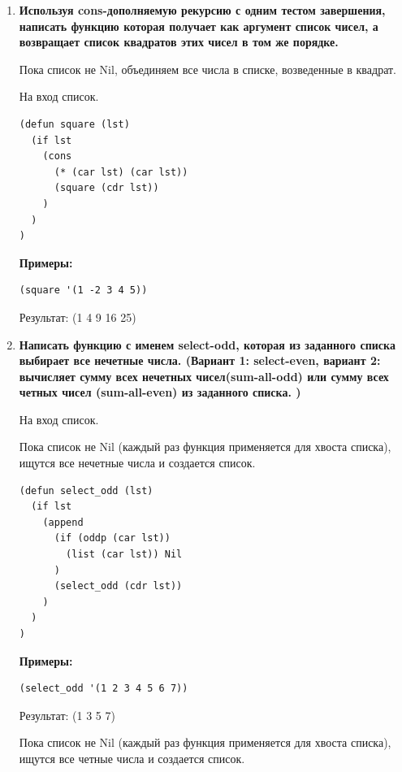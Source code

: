 \documentclass[a4paper,14pt]{extreport} %
\begin{document}
\begin{enumerate}
\textbf{Примеры:}

\begin{lstlisting}
(last_odd '(1 2 3 4 5 6 7))
\end{lstlisting}

Результат: 7

\item \textbf{Используя cons-дополняемую рекурсию с одним тестом завершения, написать функцию которая получает как аргумент список чисел, а возвращает список квадратов этих чисел в том же порядке.}

Пока список не Nil, объединяем все числа в списке, возведенные в квадрат. 

На вход список. 

\begin{lstlisting}
(defun square (lst)
  (if lst
    (cons
      (* (car lst) (car lst))
      (square (cdr lst))
    )
  )
)
\end{lstlisting}

\textbf{Примеры:}

\begin{lstlisting}
(square '(1 -2 3 4 5))
\end{lstlisting}

Результат: (1 4 9 16 25)

\item \textbf{Написать функцию с именем select-odd, которая из заданного списка выбирает все нечетные числа. (Вариант 1: select-even, вариант 2: вычисляет сумму всех нечетных чисел(sum-all-odd) или сумму всех четных чисел (sum-all-even) из заданного списка. )}

На вход список. 

Пока список не Nil (каждый раз функция применяется для хвоста списка), ищутся все нечетные числа и создается список. 

\begin{lstlisting}
(defun select_odd (lst)
  (if lst
    (append
      (if (oddp (car lst))
      	(list (car lst)) Nil
      )
      (select_odd (cdr lst))
    )
  )
)
\end{lstlisting}

\textbf{Примеры:}

\begin{lstlisting}
(select_odd '(1 2 3 4 5 6 7))
\end{lstlisting}

Результат: (1 3 5 7)

Пока список не Nil (каждый раз функция применяется для хвоста списка), ищутся все четные числа и создается список. 


\end{enumerate}
\end{document}
